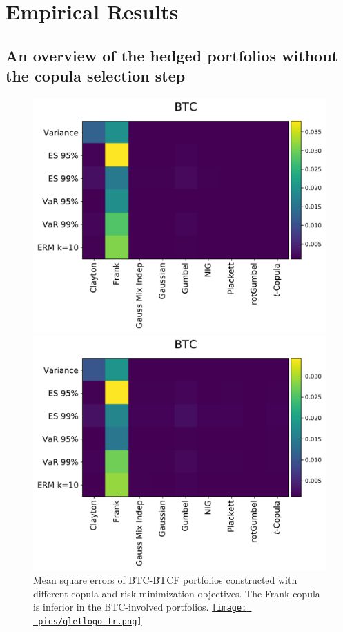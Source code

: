 \section{Empirical Results}\label{sec:results}



\subsection{An overview of the hedged portfolios without the copula selection step}\label{subsec:HP1}
\begin{figure}[t]
\centering
\begin{minipage}[t]{.475\textwidth}
    \centering
    \includegraphics[width=\textwidth]{_pics/MSE_BTC.pdf}
  \caption{Mean square errors of BTC-BTCF portfolios constructed with different copula and risk minimization objectives.
    The Frank copula is inferior in the BTC-involved portfolios.
    \href{http://www.quantlet.com/}{\texttt{[image: \_pics/qletlogo\_tr.png]}} }
\label{fig:MSE_BTC}
\end{minipage}%
\hfill
\begin{minipage}[t]{.475\textwidth}
    \centering
    \includegraphics[width=\textwidth]{_pics/semiLowerVariance_BTC.pdf}

\end{minipage}
\end{figure}
